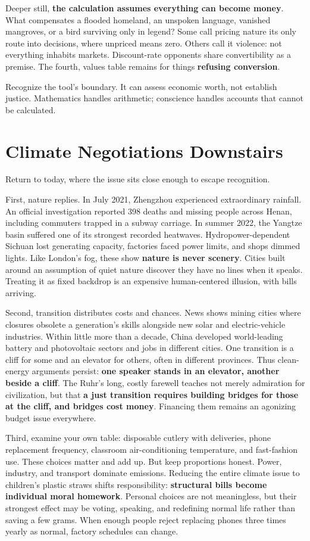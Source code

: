 Deeper still, \textbf{the calculation assumes everything can become money}. What compensates a flooded homeland, an unspoken language, vanished mangroves, or a bird surviving only in legend? Some call pricing nature its only route into decisions, where unpriced means zero. Others call it violence: not everything inhabits markets. Discount-rate opponents share convertibility as a premise. The fourth, values table remains for things \textbf{refusing conversion}.

Recognize the tool's boundary. It can assess economic worth, not establish justice. Mathematics handles arithmetic; conscience handles accounts that cannot be calculated.

\section{Climate Negotiations Downstairs}
Return to today, where the issue sits close enough to escape recognition.

First, nature replies. In July 2021, Zhengzhou experienced extraordinary rainfall. An official investigation reported 398 deaths and missing people across Henan, including commuters trapped in a subway carriage. In summer 2022, the Yangtze basin suffered one of its strongest recorded heatwaves. Hydropower-dependent Sichuan lost generating capacity, factories faced power limits, and shops dimmed lights. Like London's fog, these show \textbf{nature is never scenery}. Cities built around an assumption of quiet nature discover they have no lines when it speaks. Treating it as fixed backdrop is an expensive human-centered illusion, with bills arriving.

Second, transition distributes costs and chances. News shows mining cities where closures obsolete a generation's skills alongside new solar and electric-vehicle industries. Within little more than a decade, China developed world-leading battery and photovoltaic sectors and jobs in different cities. One transition is a cliff for some and an elevator for others, often in different provinces. Thus clean-energy arguments persist: \textbf{one speaker stands in an elevator, another beside a cliff}. The Ruhr's long, costly farewell teaches not merely admiration for civilization, but that \textbf{a just transition requires building bridges for those at the cliff, and bridges cost money}. Financing them remains an agonizing budget issue everywhere.

Third, examine your own table: disposable cutlery with deliveries, phone replacement frequency, classroom air-conditioning temperature, and fast-fashion use. These choices matter and add up. But keep proportions honest. Power, industry, and transport dominate emissions. Reducing the entire climate issue to children's plastic straws shifts responsibility: \textbf{structural bills become individual moral homework}. Personal choices are not meaningless, but their strongest effect may be voting, speaking, and redefining normal life rather than saving a few grams. When enough people reject replacing phones three times yearly as normal, factory schedules can change.

